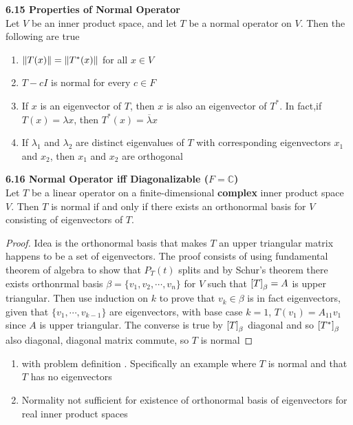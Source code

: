 \documentclass[11pt]{article}
\begin{document}
\begin{theorem*}
    \textbf{6.15 Properties of Normal Operator} \\ 
    Let $V$ be an inner product space, and let $T$ be a normal operator on $V$. Then the following are true
    \begin{enumerate}
        \item $\left\lVert T(x)\right\rVert = \left\lVert T^*(x)\right\rVert$ for all $x\in V$
        \item $T - cI$ is normal for every $c\in F$
        \item If $x$ is an eigenvector of $T$, then $x$ is also an eigenvector of $T^*$. In fact,if $T(x) = \lambda x$, then $T^*(x) = \overline{\lambda} x$
        \item If $\lambda_1$ and $\lambda_2$ are distinct eigenvalues of $T$ with corresponding eigenvectors $x_1$ and $x_2$, then $x_1$ and $x_2$ are orthogonal
    \end{enumerate}
\end{theorem*}

\begin{theorem*}
    \textbf{6.16 Normal Operator iff Diagonalizable ($F=\mathbb{C}$)} \\
    Let $T$ be a linear operator on a finite-dimensional \textbf{complex} inner product space $V$. Then $T$ is normal if and only if there exists an orthonormal basis for $V$ consisting of eigenvectors of $T$.
    \begin{proof}
        Idea is the orthonormal basis that makes $T$ an upper triangular matrix happens to be a set of eigenvectors. The proof consists of using fundamental theorem of algebra to show that $P_T(t)$ splits and by Schur's theorem there exists orthonrmal basis $\beta = \{v_1,v_2,\cdots, v_n\}$ for $V$ such that $\left[ T \right]_{\beta} = A$ is upper triangular. Then use induction on $k$ to prove that $v_k \in \beta$ is in fact eigenvectors, given that $\{v_1,\cdots, v_{k-1}\}$ are eigenvectors, with base case $k=1$, $T(v_1) = A_{11}v_1$ since $A$ is upper triangular. The converse is true by $\left[ T \right]_{\beta}$ diagonal and so $\left[ T^* \right]_{\beta}$ also diagonal, diagonal matrix commute, so $T$ is normal
    \end{proof}
    \begin{enumerate}
        \item {} with problem definition . Specifically an example where $T$ is normal and that $T$ has no eigenvectors
        \item Normality not sufficient for existence of orthonormal basis of eigenvectors for real inner product spaces 
    \end{enumerate}
\end{theorem*}
\end{document}
